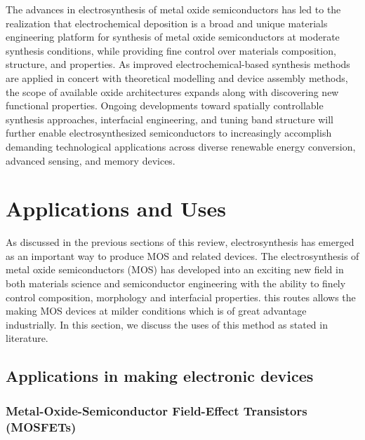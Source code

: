 \documentclass[12pt,a4paper]{report}
\begin{document}
	The advances in electrosynthesis of metal oxide semiconductors has led to the realization that electrochemical deposition is a broad and unique materials engineering platform for synthesis of metal oxide semiconductors at moderate synthesis conditions, while providing fine control over materials composition, structure, and properties. As improved electrochemical-based synthesis methods are applied in concert with theoretical modelling and device assembly methods, the scope of available oxide architectures expands along with discovering new functional properties. Ongoing developments toward spatially controllable synthesis approaches, interfacial engineering, and tuning band structure will further enable electrosynthesized semiconductors to increasingly accomplish demanding technological applications across diverse renewable energy conversion, advanced sensing, and memory devices.
	
	
	
	
	\chapter{Applications and Uses}
	As discussed in the previous sections of this review, electrosynthesis has emerged as an important way to produce MOS and related devices. The electrosynthesis of metal oxide semiconductors (MOS) has developed into an exciting new field in both materials science and semiconductor engineering with the ability to finely control composition, morphology and interfacial properties. this routes allows the making MOS devices at milder conditions which is of great advantage industrially. In this section, we discuss the uses of this method as stated in literature. 
	
	\section{Applications in making electronic devices}
	\subsection{Metal-Oxide-Semiconductor Field-Effect Transistors (MOSFETs)}
	
\end{document}
